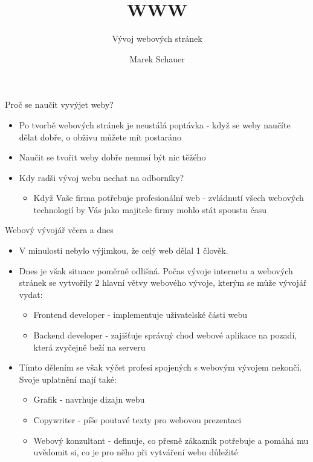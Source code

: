 \documentclass[fyma,pdf,final]{prosper}
\begin{document}
	\title{WWW}
	\subtitle{Vývoj webových stránek}
	\author{Marek Schauer}
	\maketitle

	\begin{slide}{Proč se naučit vyvýjet weby?}
		\begin{itemize}
			\item Po tvorbě webových stránek je neustálá poptávka - když se weby naučíte dělat dobře, o obživu můžete mít postaráno
			\item Naučit se tvořit weby dobře nemusí být nic těžého
			\item Kdy radši vývoj webu nechat na odborníky?
				\begin{itemize}
					\item Když Vaše firma potřebuje profesionální web - zvládnutí všech webových technologií by Vás jako majitele firmy mohlo stát spoustu času
				\end{itemize}

		\end{itemize}
	\end{slide}

	\begin{slide}{Webový vývojář včera a dnes}
		\begin{itemize}
			\item V minulosti nebylo výjimkou, že celý web dělal 1 člověk.
			\item Dnes je však situace poměrně odlišná. Počas vývoje internetu a webových stránek se vytvořily 2 hlavní větvy webového vývoje, kterým se může vývojář vydat:
				\begin{itemize}
					\item Frontend developer - implementuje uživatelské části webu
					\item Backend developer - zajišťuje správný chod webové aplikace na pozadí, která zvyčejně beží na serveru
				\end{itemize}
			\item Tímto dělením se však výčet profesí spojených s webovým vývojem nekončí. Svoje uplatnění mají také:
				\begin{itemize}
					\item Grafik - navrhuje dizajn webu
					\item Copywriter - píše poutavé texty pro webovou prezentaci
					\item Webový konzultant - definuje, co přesně zákazník potřebuje a pomáhá mu uvědomit si, co je pro něho při vytváření webu důležité
				\end{itemize}
		\end{itemize}
	\end{slide}
\end{document}

